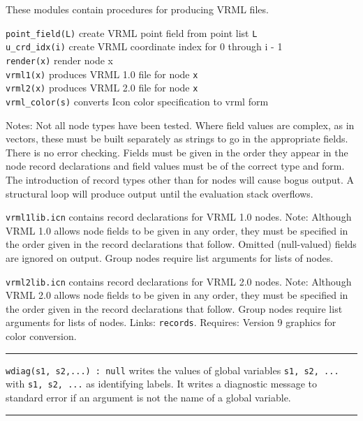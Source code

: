 These modules contain procedures for producing VRML files.

\texttt{point\_field(L)} create VRML point field from point list
\texttt{L\\
u\_crd\_idx(i)} create VRML coordinate index for 0 through i - 1\\
\texttt{render(x)} render node x\\
\texttt{vrml1(x)} produces VRML 1.0 file for node \texttt{x\\
vrml2(x)} produces VRML 2.0 file for node \texttt{x\\
vrml\_color(s)} converts Icon color specification to vrml form

Notes: Not all node types have been tested. Where field values are
complex, as in vectors, these must be built separately as strings to go
in the appropriate fields. There is no error checking. Fields must be
given in the order they appear in the node record declarations and
field values must be of the correct type and form. The introduction of
record types other than for nodes will cause bogus output. A structural
loop will produce output until the evaluation stack
overflows.

\texttt{vrml1lib.icn} contains record declarations for VRML 1.0 nodes.
Note: Although VRML 1.0 allows node fields to be given in any order,
they must be specified in the order given in the record declarations
that follow. Omitted (null-valued) fields are ignored on output. Group
nodes require list arguments for lists of nodes.

\texttt{vrml2lib.icn} contains record declarations for VRML 2.0 nodes.
Note: Although VRML 2.0 allows node fields to be given in any order,
they must be specified in the order given in the record declarations
that follow. Group nodes require list arguments for lists of nodes. 
Links: \texttt{records}. Requires: Version 9 graphics for color
conversion. 

\vspace{0.25cm}\hrule{}

\texttt{wdiag(s1, s2,...) : null} writes the values of global
variables \texttt{s1, s2, ...} with \texttt{s1, s2, ...} as
identifying labels. It writes a diagnostic message to standard error
if an argument is not the name of a global variable.

\vspace{0.25cm}\hrule{}

